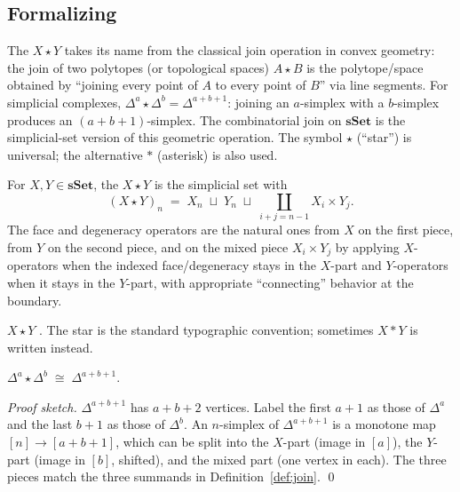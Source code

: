 \subsection{Formalizing}

\begin{nameorigin}
The  $X \star Y$ takes its name from the classical
join operation in convex geometry: the join of two polytopes (or
topological spaces) $A \star B$ is the polytope/space obtained by
``joining every point of $A$ to every point of $B$'' via line segments.
For simplicial complexes, $\Delta^a \star \Delta^b = \Delta^{a+b+1}$:
joining an $a$-simplex with a $b$-simplex produces an
$(a+b+1)$-simplex. The combinatorial join on $\mathbf{sSet}$ is the
simplicial-set version of this geometric operation. The symbol $\star$
(``star'') is universal; the alternative $*$ (asterisk) is also used.
\end{nameorigin}

\begin{definition}
\label{def:join}
For $X, Y \in \mathbf{sSet}$, the  $X \star Y$ is the
simplicial set with
\begin{equation*}
  (X \star Y)_n \;=\; X_n \;\sqcup\; Y_n \;\sqcup\; \coprod_{i + j = n - 1} X_i \times Y_j.
\end{equation*}
The face and degeneracy operators are the natural ones from $X$ on the
first piece, from $Y$ on the second piece, and on the mixed piece $X_i
\times Y_j$ by applying $X$-operators when the indexed face/degeneracy
stays in the $X$-part and $Y$-operators when it stays in the $Y$-part,
with appropriate ``connecting'' behavior at the boundary.
\end{definition}

\begin{howtosay}
$X \star Y$ . The star is the standard
typographic convention; sometimes $X * Y$ is written instead.
\end{howtosay}

\begin{theorem}
\label{thm:join-delta}
$\Delta^a \star \Delta^b \;\cong\; \Delta^{a + b + 1}$.
\end{theorem}

\begin{proof}[Proof sketch]
$\Delta^{a+b+1}$ has $a + b + 2$ vertices. Label the first $a+1$ as
those of $\Delta^a$ and the last $b+1$ as those of $\Delta^b$. An
$n$-simplex of $\Delta^{a+b+1}$ is a monotone map $[n] \to [a+b+1]$,
which can be split into the $X$-part (image in $[a]$), the $Y$-part
(image in $[b]$, shifted), and the mixed part (one vertex in each). The
three pieces match the three summands in
Definition~\ref{def:join}. \qed
\end{proof}

